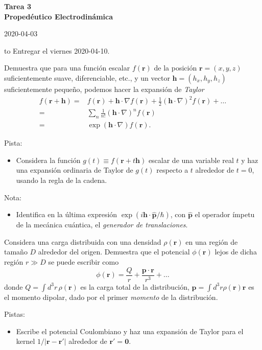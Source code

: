 \documentclass{exam}
\begin{document}
\begin{center}
\bf\large Tarea 3\\
Propedéutico Electrodinámica\\
\date{2020-04-03}
2020-04-03
\\[20pt]
\end{center}
\hbox to \textwidth{Nombre: \enspace\hrulefill}
Entregar el viernes 2020-04-10.

\begin{questions}
  \question Demuestra que para una función escalar $f(\bm r)$ de la posición
  $\bm r=(x,y,z)$ suficientemente suave, diferenciable, etc., y un
  vector $\bm h=(h_x, h_y, h_z)$ suficientemente pequeño,
  podemos hacer la expansión de {\em Taylor}
  \begin{align*}
    f(\bm r + \bm h)=&f(\bm r)+\bm h\cdot\nabla f(\bm r)+\frac{1}{2}(\bm
                     h\cdot\nabla)^2 f(\bm r)+\ldots\\
    =&\sum_n \frac{1}{n!}(\bm h\cdot\nabla)^n  f(\bm r)\\
    =& \exp(\bm h\cdot\nabla)f(\bm r).
  \end{align*}

  Pista:
  \begin{itemize}
  \item Considera la función $g(t)\equiv f(\bm r+t\bm h)$ escalar de
    una variable real $t$ y haz una expansión ordinaria de Taylor
    de $g(t)$ respecto a $t$ alrededor de $t=0$, usando la regla de la cadena.
  \end{itemize}
  Nota:
  \begin{itemize}
  \item Identifica en la última expresión $\exp(i\bm
    h\cdot\hat{\bm p}/\hbar)$, con $\hat{\bm p}$ el operador ímpetu de
    la mecánica cuántica, el {\em generador de translaciones}.
  \end{itemize}
  \question Considera una carga distribuida con una densidad $\rho(\bm
  r)$ en una región de tamaño $D$ alrededor del origen. Demuestra que
  el potencial $\phi(\bm r)$ lejos de dicha región $r\gg D$ se puede
  escribir como
  $$\phi(\bm r)=\frac{Q}{r} + \frac{\bm p\cdot\bm r}{r^3} +\ldots
  $$
  donde
  $Q=\int d^3r\,\rho(\bm r)$ es la carga total de la distribución,
  $\bm p=\int d^3r \rho(\bm r)\bm r$ es el momento dipolar, dado por
  el primer {\em momento} de la distribución.

  Pistas:
  \begin{itemize}
  \item Escribe el potencial Coulombiano y haz una expansión de Taylor
    para el kernel $1/|\bm r-\bm r'|$ alrededor de $\bm r'=\bm 0$.
  \end{itemize}


\end{questions}
\end{document}
